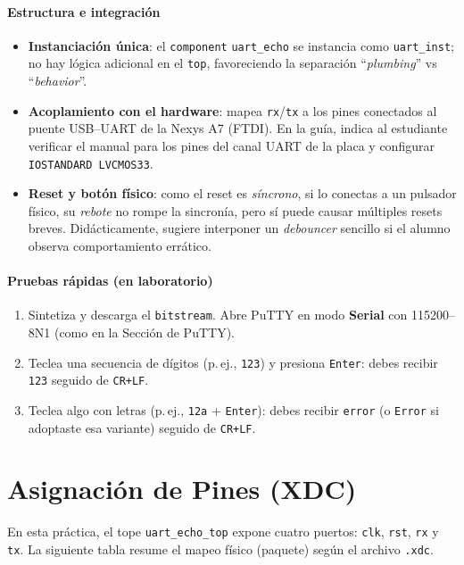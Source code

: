 \documentclass[a4paper,12pt]{article}
\begin{document}
\paragraph{Estructura e integración}
\begin{itemize}
  \item \textbf{Instanciación única}: el \texttt{component} \texttt{uart\_echo} se instancia como \texttt{uart\_inst}; no hay lógica adicional en el \texttt{top}, favoreciendo la separación “\emph{plumbing}” vs “\emph{behavior}”.
  \item \textbf{Acoplamiento con el hardware}: mapea \texttt{rx}/\texttt{tx} a los pines conectados al puente USB–UART de la Nexys A7 (FTDI). En la guía, indica al estudiante verificar el manual para los pines del canal UART de la placa y configurar \texttt{IOSTANDARD LVCMOS33}.
  \item \textbf{Reset y botón físico}: como el reset es \emph{síncrono}, si lo conectas a un pulsador físico, su \emph{rebote} no rompe la sincronía, pero sí puede causar múltiples resets breves. Didácticamente, sugiere interponer un \emph{debouncer} sencillo si el alumno observa comportamiento errático.
\end{itemize}

\paragraph{Pruebas rápidas (en laboratorio)}
\begin{enumerate}
  \item Sintetiza y descarga el \texttt{bitstream}. Abre PuTTY en modo \textbf{Serial} con 115200–8N1 (como en la Sección de PuTTY).
  \item Teclea una secuencia de dígitos (p.\,ej., \texttt{123}) y presiona \texttt{Enter}: debes recibir \texttt{123} seguido de \texttt{CR+LF}.
  \item Teclea algo con letras (p.\,ej., \texttt{12a} + \texttt{Enter}): debes recibir \texttt{error} (o \texttt{Error} si adoptaste esa variante) seguido de \texttt{CR+LF}.
\end{enumerate}

\section{Asignación de Pines (XDC)}

En esta práctica, el tope \texttt{uart\_echo\_top} expone cuatro puertos: \texttt{clk}, \texttt{rst}, \texttt{rx} y \texttt{tx}. La siguiente tabla resume el mapeo físico (paquete) según el archivo \texttt{.xdc}.
\end{document}
